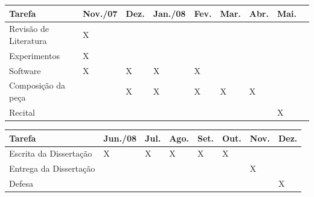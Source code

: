 \documentclass{article}
\begin{document}
\begin{table}[h]
  \begin{tabular}{lllllllll}
    \hline
    Tarefa & Nov./07 & Dez. & Jan./08 & Fev. & Mar. & Abr. & Mai. \\
    \hline
    Revisão de Literatura & X &  &  & & & & & \\
    Experimentos & X & & & & & & & \\
    Software & X & X & X & X & & & &  \\
    Composição da peça & & X & X & X & X & X \\
    Recital & &  & & & & & X \\
    \hline
  \end{tabular}
\end{table}
\begin{table}[h]
  \begin{tabular}{llllllll}
    \hline
    Tarefa & Jun./08 & Jul. & Ago. & Set. & Out. & Nov. & Dez. \\
    \hline
    Escrita da Dissertação & X & X & X & X & X & & \\
    Entrega da Dissertação & & & & & & X & \\
    Defesa & & & & & & & X \\
    \hline
  \end{tabular}

  \label{tab:cronograma}
\end{table}

\renewcommand{\refname}{Bibliografia}

\nocite{alves05:_invar,buteau2005ama,buteau2003tmm,buteau1999mta,buteau2000csm,cambouropoulos2001mca,cambouropoulos2005pea,clifford1995cse,cook87:_techn_compar_analy,discipio2000ajc,dowling1994mch,dowling1978sac,dowling1971rim,edworthy1985mca,friedmann1987rmc,friedmann85:_method_discus_contour,Hermann1995,hofmannengl1999vpa,ishiyama1996act,kim2000acb,kolinkski65:_struc_melod_movem,lindsay1996ucm,maidin:gam,marvin1988gtm,marvin87:_relat_music_contour,morris93:_new_direc_theor_analy_music_contour,morris1987cpc,parsons1975dta,polansky87mma,polansky92:_possib_impos_melod,quinn2006mcp,quinn97:_fuzzy_exten_theor_contour,ravenscroft2006rcc,music02:_melody,roy2004cbm,schmuckler1999tmm,schubert2006eih,schonberg1967fmc,seeger1960mml,Siu-LanTan04012004,toch1977sfm,toiviainen2002cmm}



\end{document}
